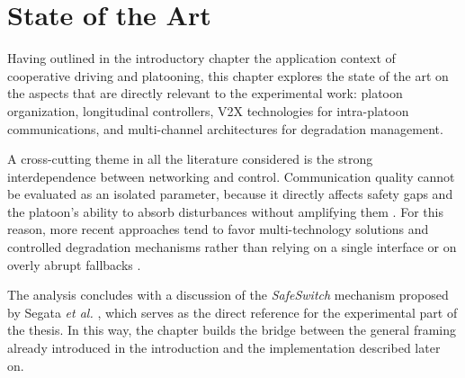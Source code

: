\chapter{State of the Art}
\label{ch:sota}

Having outlined in the introductory chapter the application context of cooperative driving and platooning, this chapter explores the state of the art on the aspects that are directly relevant to the experimental work: platoon organization, longitudinal controllers, V2X technologies for intra-platoon communications, and multi-channel architectures for degradation management.

A cross-cutting theme in all the literature considered is the strong interdependence between networking and control. Communication quality cannot be evaluated as an isolated parameter, because it directly affects safety gaps and the platoon's ability to absorb disturbances without amplifying them \cite{dressler2019cooperative,giordano2019joint,segata2016safe}. For this reason, more recent approaches tend to favor multi-technology solutions and controlled degradation mechanisms rather than relying on a single interface or on overly abrupt fallbacks \cite{ishihara2015improving,segata2016platooning,segata2023multi-technology}.

The analysis concludes with a discussion of the \emph{SafeSwitch} mechanism proposed by Segata \emph{et al.} \cite{segata2023multi-technology}, which serves as the direct reference for the experimental part of the thesis. In this way, the chapter builds the bridge between the general framing already introduced in the introduction and the implementation described later on.
